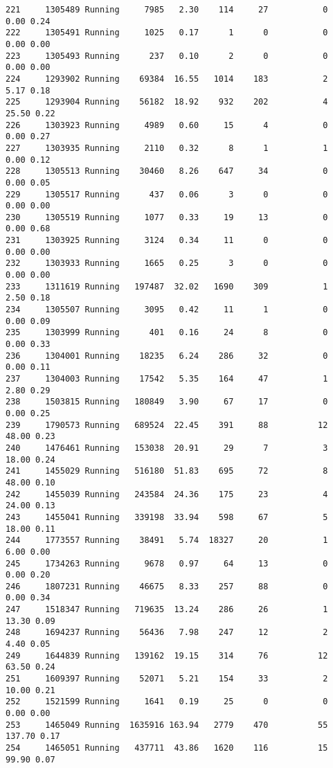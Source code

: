 \documentclass[
]{article}
\begin{document}
\begin{verbatim}
221     1305489 Running     7985   2.30    114     27           0    0.00 0.24
222     1305491 Running     1025   0.17      1      0           0    0.00 0.00
223     1305493 Running      237   0.10      2      0           0    0.00 0.00
224     1293902 Running    69384  16.55   1014    183           2    5.17 0.18
225     1293904 Running    56182  18.92    932    202           4   25.50 0.22
226     1303923 Running     4989   0.60     15      4           0    0.00 0.27
227     1303935 Running     2110   0.32      8      1           1    0.00 0.12
228     1305513 Running    30460   8.26    647     34           0    0.00 0.05
229     1305517 Running      437   0.06      3      0           0    0.00 0.00
230     1305519 Running     1077   0.33     19     13           0    0.00 0.68
231     1303925 Running     3124   0.34     11      0           0    0.00 0.00
232     1303933 Running     1665   0.25      3      0           0    0.00 0.00
233     1311619 Running   197487  32.02   1690    309           1    2.50 0.18
234     1305507 Running     3095   0.42     11      1           0    0.00 0.09
235     1303999 Running      401   0.16     24      8           0    0.00 0.33
236     1304001 Running    18235   6.24    286     32           0    0.00 0.11
237     1304003 Running    17542   5.35    164     47           1    2.80 0.29
238     1503815 Running   180849   3.90     67     17           0    0.00 0.25
239     1790573 Running   689524  22.45    391     88          12   48.00 0.23
240     1476461 Running   153038  20.91     29      7           3   18.00 0.24
241     1455029 Running   516180  51.83    695     72           8   48.00 0.10
242     1455039 Running   243584  24.36    175     23           4   24.00 0.13
243     1455041 Running   339198  33.94    598     67           5   18.00 0.11
244     1773557 Running    38491   5.74  18327     20           1    6.00 0.00
245     1734263 Running     9678   0.97     64     13           0    0.00 0.20
246     1807231 Running    46675   8.33    257     88           0    0.00 0.34
247     1518347 Running   719635  13.24    286     26           1   13.30 0.09
248     1694237 Running    56436   7.98    247     12           2    4.40 0.05
249     1644839 Running   139162  19.15    314     76          12   63.50 0.24
251     1609397 Running    52071   5.21    154     33           2   10.00 0.21
252     1521599 Running     1641   0.19     25      0           0    0.00 0.00
253     1465049 Running  1635916 163.94   2779    470          55  137.70 0.17
254     1465051 Running   437711  43.86   1620    116          15   99.90 0.07

\end{verbatim}
\end{document}
